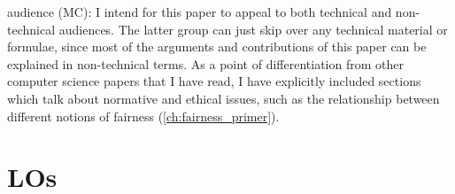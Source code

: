 \begin{itemize}




\hashtag audience (MC): I intend for this paper to appeal to both technical and non-technical audiences. The latter group can just skip over any technical material or formulae, since most of the arguments and contributions of this paper can be explained in non-technical terms. As a point of differentiation from other computer science papers that I have read, I have explicitly included sections which talk about normative and ethical issues, such as the relationship between different notions of fairness (\autoref{ch:fairness_primer}).


\end{itemize}

\section{LOs}

